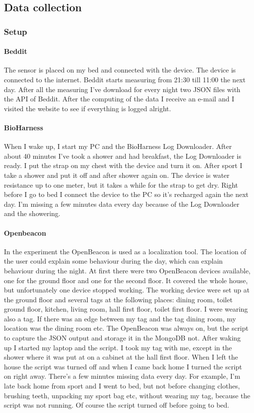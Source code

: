 	\subsection{Data collection}
		\subsubsection{Setup}
			\paragraph{Beddit}
				The sensor is placed on my bed and connected with the device. The device is connected to the internet. Beddit starts measuring from 21:30 till 11:00 the next day. After all the measuring I've download for every night two JSON files with the API of Beddit\cite{bedditapi}. After the computing of the data I receive an e-mail and I visited the website to see if everything is logged alright.
			\paragraph{BioHarness}
				When I wake up, I start my PC and the BioHarness Log Downloader. After about 40 minutes I've took a shower and had breakfast, the Log Downloader is ready. I put the strap on my chest with the device and turn it on. After sport I take a shower and put it off and after shower again on. The device is water resistance up to one meter, but it takes a while for the strap to get dry. Right before I go to bed I connect the device to the PC so it's recharged again the next day. I'm missing a few minutes data every day because of the Log Downloader and the showering. 
			\paragraph{Openbeacon}
		 		In the experiment the OpenBeacon is used as a localization tool. The location of the user could explain some behaviour during the day, which can explain behaviour during the night. At first there were two OpenBeacon devices available, one for the ground floor and one for the second floor. It covered the whole house, but unfortunately one device stopped working. The working device were set up at the ground floor and several tags at the following places: dining room, toilet ground floor, kitchen, living room, hall first floor, toilet first floor. I were wearing also a tag. If there was an edge between my tag and the tag dining room, my location was the dining room etc. The OpenBeacon was always on, but the script to capture the JSON output and storage it in the MongoDB not. After waking up I started my laptop and the script. I took my tag with me, except in the shower where it was put at on a cabinet at the hall first floor. When I left the house the script was turned off and when I came back home I turned the script on right away. There's a few minutes missing data every day. For example, I'm late back home from sport and I went to bed, but not before changing clothes, brushing teeth, unpacking my sport bag etc, without wearing my tag, because the script was not running. Of course the script turned off before going to bed.

